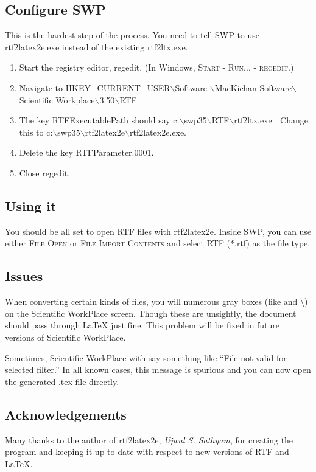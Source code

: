 \documentclass{article}
\newcommand{\TEXTsymbol}[1]{$#1$}
\begin{document}
\subsection{Configure SWP}

This is the hardest step of the process. You need to tell SWP to use \textsf{%
rtf2latex2e.exe} instead of the existing \textsf{rtf2ltx.exe}.

\begin{enumerate}
\item Start the registry editor, \textsf{regedit}. (In Windows, \textsc{%
Start - Run... - regedit}.)

\item Navigate to \textsf{HKEY\_CURRENT\_USER\TEXTsymbol{\backslash}Software%
\TEXTsymbol{\backslash}MacKichan Software\TEXTsymbol{\backslash}Scientific
Workplace\TEXTsymbol{\backslash}3.50\TEXTsymbol{\backslash}RTF}

\item The key \textsf{RTFExecutablePath} should say \textsf{c:\TEXTsymbol{%
\backslash}swp35\TEXTsymbol{\backslash}RTF\TEXTsymbol{\backslash}rtf2ltx.exe}%
. Change this to \textsf{c:\TEXTsymbol{\backslash}swp35\TEXTsymbol{\backslash%
}rtf2latex2e\TEXTsymbol{\backslash}rtf2latex2e.exe}.

\item Delete the key \textsf{RTFParameter.0001}.

\item Close \textsf{regedit}.
\end{enumerate}

\subsection{Using it}

You should be all set to open RTF files with \textsf{rtf2latex2e}. Inside
SWP, you can use either \textsc{File Open} or \textsc{File Import Contents}
and select \textsf{RTF (*.rtf)} as the file type.

\subsection{Issues}

When converting certain kinds of files, you will numerous gray boxes (like {%
\textquotedbl and \textbackslash}) on the Scientific WorkPlace screen.
Though these are unsightly, the document should pass through LaTeX just
fine. This problem will be fixed in future versions of Scientific WorkPlace.

Sometimes, Scientific WorkPlace with say something like ``File not valid for
selected filter.'' In all known cases, this message is spurious and you can
now open the generated .tex file directly.

\subsection{Acknowledgements}

Many thanks to the author of rtf2latex2e, \textsl{Ujwal S. Sathyam}, for
creating the program and keeping it up-to-date with respect to new versions
of RTF and LaTeX.
\end{document}
